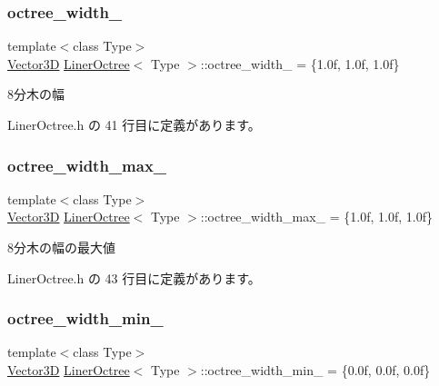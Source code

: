 \subsubsection{\texorpdfstring{octree\+\_\+width\+\_\+}{octree\_width\_}}
{\footnotesize\ttfamily template$<$class Type$>$ \\
\mbox{\hyperlink{class_vector3_d}{Vector3D}} \mbox{\hyperlink{class_liner_octree}{Liner\+Octree}}$<$ Type $>$\+::octree\+\_\+width\+\_\+ = \{1.\+0f, 1.\+0f, 1.\+0f\}\hspace{0.3cm}{\ttfamily [private]}}



8分木の幅 



 Liner\+Octree.\+h の 41 行目に定義があります。

\mbox{\label{class_liner_octree_a29578ee8b44b1da05dadc291cfc4c354}} 
\subsubsection{\texorpdfstring{octree\+\_\+width\+\_\+max\+\_\+}{octree\_width\_max\_}}
{\footnotesize\ttfamily template$<$class Type$>$ \\
\mbox{\hyperlink{class_vector3_d}{Vector3D}} \mbox{\hyperlink{class_liner_octree}{Liner\+Octree}}$<$ Type $>$\+::octree\+\_\+width\+\_\+max\+\_\+ = \{1.\+0f, 1.\+0f, 1.\+0f\}\hspace{0.3cm}{\ttfamily [private]}}



8分木の幅の最大値 



 Liner\+Octree.\+h の 43 行目に定義があります。

\mbox{\label{class_liner_octree_a5992f986cf372dc2467c4dd2dec8771b}} 
\subsubsection{\texorpdfstring{octree\+\_\+width\+\_\+min\+\_\+}{octree\_width\_min\_}}
{\footnotesize\ttfamily template$<$class Type$>$ \\
\mbox{\hyperlink{class_vector3_d}{Vector3D}} \mbox{\hyperlink{class_liner_octree}{Liner\+Octree}}$<$ Type $>$\+::octree\+\_\+width\+\_\+min\+\_\+ = \{0.\+0f, 0.\+0f, 0.\+0f\}\hspace{0.3cm}{\ttfamily [private]}}




